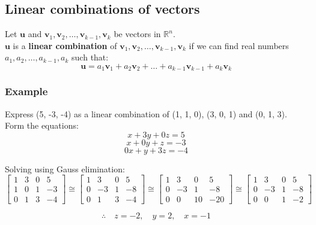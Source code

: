 \documentclass[11pt]{article}
\begin{document}
\subsection{Linear combinations of vectors}
\label{sec:org726aaa0}
Let \(\boldsymbol{u}\) and \(\boldsymbol{v}_1, \boldsymbol{v}_2, \ldots, \boldsymbol{v}_{k-1}, \boldsymbol{v}_k\) be vectors in \(\mathbb{R}^n\).
\\[0pt]

\(\boldsymbol{u}\) is a \textbf{linear combination} of \(\boldsymbol{v}_1, \boldsymbol{v}_2, \ldots, \boldsymbol{v}_{k-1}, \boldsymbol{v}_k\) if we can find real numbers \(a_1, a_2, \ldots, a_{k-1}, a_k\) such that:
\[\boldsymbol{u} = a_1 \boldsymbol{v}_1 + a_2  \boldsymbol{v}_2 + \ldots + a_{k-1} \boldsymbol{v}_{k-1} + a_k \boldsymbol{v}_k\]

\subsubsection{Example}
\label{sec:orgc44f38d}
Express (5, -3, -4) as a linear combination of (1, 1, 0), (3, 0, 1) and (0, 1, 3).
\\[0pt]

Form the equations:
\[x + 3y + 0z = 5\]
\[x + 0y + z = -3\]
\[0x + y + 3z = -4\]

Solving using Gauss elimination:
\begin{displaymath}
\begin{bmatrix}
1 & 3 & 0 & 5 \\
1 & 0 & 1 & -3 \\
0 & 1 & 3 & -4
\end{bmatrix} \cong \begin{bmatrix}
1 & 3 & 0 & 5 \\
0 & -3 & 1 & -8 \\
0 & 1 & 3 & -4
\end{bmatrix} \cong \begin{bmatrix}
1 & 3 & 0 & 5 \\
0 & -3 & 1 & -8 \\
0 & 0 & 10 & -20
\end{bmatrix} \cong \begin{bmatrix}
1 & 3 & 0 & 5 \\
0 & -3 & 1 & -8 \\
0 & 0 & 1 & -2
\end{bmatrix}
\end{displaymath}

\[\therefore \quad z = -2, \quad y = 2, \quad x = -1\]
\end{document}

